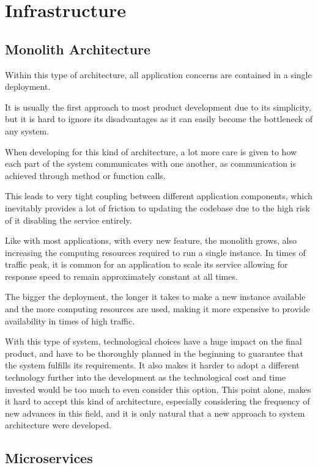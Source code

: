 \chapter{Infrastructure} \label{chap:infrastructure}

\section{Monolith Architecture}

Within this type of architecture, all application concerns are contained in a single deployment.

It is usually the first approach to most product development due to its simplicity, but it is hard to ignore its disadvantages as it can easily become the bottleneck of any system.

When developing for this kind of architecture, a lot more care is given to how each part of the system communicates with one another, as communication is achieved through method or function calls. 

This leads to very tight coupling between different application components, which inevitably provides a lot of friction to updating the codebase due to the high risk of it disabling the service entirely.

Like with most applications, with every new feature, the monolith grows, also increasing the computing resources required to run a single instance. In times of traffic peak, it is common for an application to scale its service allowing for response speed to remain approximately constant at all times. 

The bigger the deployment, the longer it takes to make a new instance available and the more computing resources are used, making it more expensive to provide availability in times of high traffic.

With this type of system, technological choices have a huge impact on the final product, and have to be thoroughly planned in the beginning to guarantee that the system fulfills its requirements. It also makes it harder to adopt a different technology further into the development as the technological cost and time invested would be too much to even consider this option. This point alone, makes it hard to accept this kind of architecture, especially considering the frequency of new advances in this field, and it is only natural that a new approach to system architecture were developed.

\section{Microservices}

